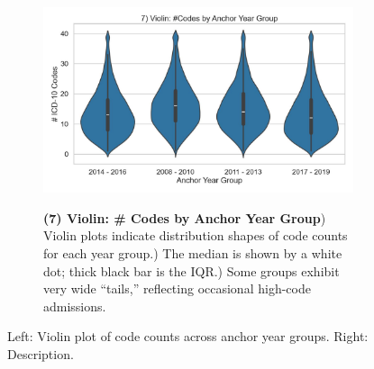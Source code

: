 \documentclass[12pt,a4paper]{report}
\begin{document}
\begin{figure}[ht!]
    \centering
    \begin{subfigure}{0.42\textwidth}
        \includegraphics[width=\linewidth]{mimic_plots/plot7.jpg}
    \end{subfigure}\hfill
    \begin{subfigure}{0.54\textwidth}
        \footnotesize
        \textbf{(7) Violin: \# Codes by Anchor Year Group}) Violin plots indicate distribution shapes of code counts for each year group.) The median is shown by a white dot; thick black bar is the IQR.) Some groups exhibit very wide “tails,” reflecting occasional high-code admissions.
    \end{subfigure}
    \caption{Left: Violin plot of code counts across anchor year groups. Right: Description.}
    \label{fig:plot7}
\end{figure}
\end{document}
